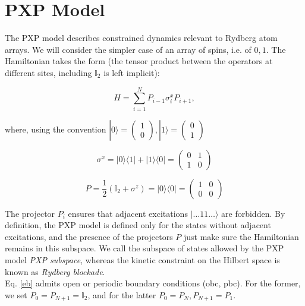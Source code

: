 \documentclass{article}
\begin{document}
\section{PXP Model}
The PXP model describes constrained dynamics relevant to Rydberg atom arrays. We will consider the simpler case of an array of spins, i.e. of $0,1$. The Hamiltonian takes the form (the tensor product between the operators at different sites, including $\mathbb{I}_2$ is left implicit):

\begin{equation}\label{eb}
H = \sum_{i=1}^N P_{i-1} \sigma^x_i P_{i+1}, 
\end{equation}

where, using the convention $|0\rangle = \begin{pmatrix} 1\\0 \end{pmatrix} , |1\rangle = \begin{pmatrix} 0\\1 \end{pmatrix}$

\begin{equation}
\sigma^x = |0\rangle \langle1| + |1\rangle \langle0| = \begin{pmatrix} 0&1\\1&0 \end{pmatrix}
\end{equation} 

\begin{equation} \label{ea}
P = \frac{1}{2} (\mathbb{I}_2 + \sigma^z) = |0\rangle\langle 0| = \begin{pmatrix} 1&0\\0&0 \end{pmatrix}
\end{equation}

The projector $P_i$ ensures that adjacent excitations $|\hdots 1 1 \hdots \rangle$ are forbidden. By definition, the PXP model is defined only for the states without adjacent excitations, and the presence of the projectors $P$ just make sure the Hamiltonian remains in this subspace. We call the subspace of states allowed by the PXP model \emph{PXP subspace}, whereas the kinetic constraint on the Hilbert space is known as \emph{Rydberg blockade}.\\
Eq. \eqref{eb} admits open or periodic boundary conditions (obc, pbc). For the former, we set $P_0 = P_{N+1} = \mathbb{I}_2$, and for the latter $P_0 = P_N, P_{N+1} = P_1$.\\
\end{document}
